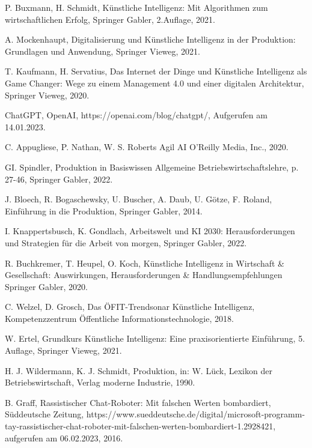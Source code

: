 

\clearpage
{}



\begin{thebibliography}{99}

	P. Buxmann, H. Schmidt,
	Künstliche Intelligenz: Mit Algorithmen zum wirtschaftlichen Erfolg,
	Springer Gabler,
	2.Auflage,
	2021.
	
	A. Mockenhaupt,
	Digitalisierung und Künstliche Intelligenz in der Produktion: Grundlagen und Anwendung,
	Springer Vieweg,
	2021.

	T. Kaufmann, H. Servatius,
	Das Internet der Dinge und Künstliche Intelligenz als Game Changer: Wege zu einem Management 4.0 und einer digitalen Architektur,
	Springer Vieweg,
	2020.

	ChatGPT,
	OpenAI,
	https://openai.com/blog/chatgpt/,
	Aufgerufen am 14.01.2023.

	C. Appugliese, P. Nathan, W. S. Roberts
	Agil AI
	O'Reilly Media, Inc.,
	2020.

	GI. Spindler,
	Produktion in Basiswissen Allgemeine Betriebswirtschaftslehre,
	p. 27-46,
	Springer Gabler,
	2022.

	J. Bloech, R. Bogaschewsky, U. Buscher, A. Daub, U. Götze, F. Roland,
	Einführung in die Produktion,
	Springer Gabler, 
	2014.
	
	I. Knappertsbusch, K. Gondlach,
	Arbeitswelt und KI 2030: Herausforderungen und Strategien für die Arbeit von morgen,
	Springer Gabler,
	2022.

	R. Buchkremer, T. Heupel, O. Koch,
	Künstliche Intelligenz in Wirtschaft \& Gesellschaft: Auswirkungen, Herausforderungen \& Handlungsempfehlungen
	Springer Gabler,
	2020.

	C. Welzel, D. Grosch,
	Das ÖFIT-Trendsonar Künstliche Intelligenz,
	Kompetenzzentrum Öffentliche Informationstechnologie,
	2018.

	W. Ertel,
	Grundkurs Künstliche Intelligenz: Eine praxisorientierte Einführung,
	5. Auflage,
	Springer Vieweg,
	2021.

	H. J. Wildermann, K. J. Schmidt,
	Produktion, 
	in: W. Lück, Lexikon der Betriebswirtschaft,
	Verlag moderne Industrie,
	1990.

	B. Graff,
	Rassistischer Chat-Roboter: Mit falschen Werten bombardiert,
	Süddeutsche Zeitung,
	https://www.sueddeutsche.de/digital/microsoft-programm-tay-rassistischer-chat-roboter-mit-falschen-werten-bombardiert-1.2928421,
	aufgerufen am 06.02.2023,
	2016.


\end{thebibliography}
